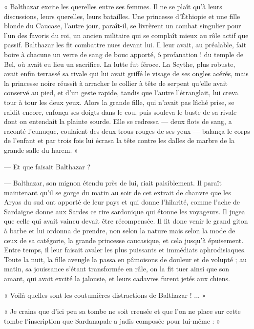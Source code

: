 \documentclass[a4paper, 11pt, oneside, polutonikogreek, french]{article}
\begin{document}
« Balthazar excite les querelles entre ses femmes. Il ne se plaît qu'à leurs discussions, leurs querelles, leurs batailles. Une princesse d'Éthiopie et une fille blonde du Caucase, l'autre jour, paraît-il, se livrèrent un combat singulier pour l'un des favoris du roi, un ancien militaire qui se complaît mieux au rôle actif que passif. Balthazar les fit combattre nues devant lui. Il leur avait, au préalable, fait boire à chacune un verre de sang de bouc apporté, ô profanation ! du temple de Bel, où avait eu lieu un sacrifice. La lutte fut féroce. La Scythe, plus robuste, avait enfin terrassé sa rivale qui lui avait griffé le visage de ses ongles acérés, mais la princesse noire réussit à arracher le collier à tête de serpent qu'elle avait conservé au pied, et d'un geste rapide, tandis que l'autre l'étranglait, lui creva tour à tour les deux yeux. Alors la grande fille, qui n'avait pas lâché prise, se raidit encore, enfonça ses doigts dans le cou, puis souleva le buste de sa rivale dont on entendait la plainte sourde. Elle se redressa --- deux flots de sang, a raconté l'eunuque, coulaient des deux trous rouges de ses yeux --- balança le corps de l'enfant et par trois fois lui écrasa la tête contre les dalles de marbre de la grande salle du harem. »

--- Et que faisait Balthazar ?

--- Balthazar, son mignon étendu près de lui, riait paisiblement. Il paraît maintenant qu'il se gorge du matin au soir de cet extrait de chanvre que les Aryas du sud ont apporté de leur pays et qui donne l'hilarité, comme l'ache de Sardaigne donne aux Sardes ce rire sardonique qui étonne les voyageurs. Il jugea que celle qui avait vaincu devait être récompensée. Il fit donc venir le grand giton à barbe et lui ordonna de prendre, non selon la nature mais selon la mode de ceux de sa catégorie, la grande princesse caucasique, et cela jusqu'à épuisement. Entre temps, il leur faisait avaler les plus puissants et immédiats aphrodisiaques. Toute la nuit, la fille aveugle la passa en pâmoisons de douleur et de volupté ; au matin, sa jouissance s'étant transformée en râle, on la fit tuer ainsi que son amant, qui avait excité la jalousie, et leurs cadavres furent jetés aux chiens.

« Voilà quelles sont les coutumières distractions de Balthazar ! ... »

\bigskip
\centerline{\EightStarTaper}
\centerline{\EightStarTaper\EightStarTaper}
\bigskip

« Je crains que d'ici peu sa tombe ne soit creusée et que l'on ne place sur cette tombe l'inscription que Sardanapale a jadis composée pour lui-même : »
\end{document}
